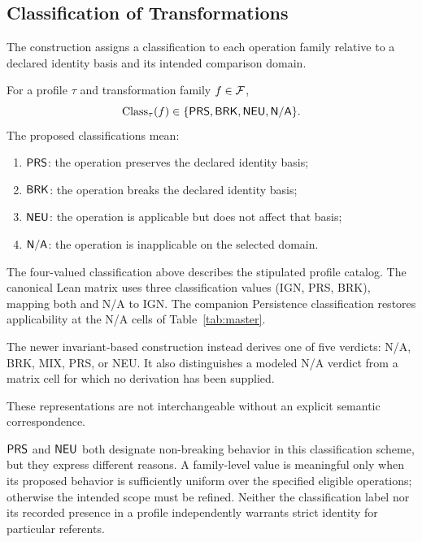 \subsection{Classification of Transformations}
\label{subsec:classification_transformations}

The construction assigns a classification to each operation family
relative to a declared identity basis and its intended comparison domain.

\begin{definition}
  \label{se200.def.TransformationClassification}
  For a profile $\tau$ and transformation family $f\in\mathcal{F}$,
  \[
    \mathrm{Class}_\tau(f)\in\{\textsf{PRS},\textsf{BRK},\textsf{NEU},\textsf{N/A}\}.
  \]
  The proposed classifications mean:
  \begin{enumerate}[label=(\alph*),nosep]
    \item $\textsf{PRS}$: the operation preserves the declared identity basis;
    \item $\textsf{BRK}$: the operation breaks the declared identity basis;
    \item $\textsf{NEU}$: the operation is applicable but does not affect that basis;
    \item $\textsf{N/A}$: the operation is inapplicable on the selected domain.
  \end{enumerate}
\end{definition}

The four-valued classification above describes the stipulated
profile catalog.
The canonical Lean matrix uses
three classification values (IGN, PRS, BRK),
mapping both \NEU{} and N/A to IGN.
The companion Persistence classification restores applicability
at the N/A cells of Table~\ref{tab:master}.

The newer invariant-based construction instead derives one of
five verdicts:
N/A, BRK, MIX, PRS, or NEU.
It also distinguishes
a modeled N/A verdict from a matrix cell for which no derivation
has been supplied.

These representations are not interchangeable without an
explicit semantic correspondence.

$\textsf{PRS}$ and $\textsf{NEU}$ both designate non-breaking behavior in this
classification scheme, but they express different reasons.
A family-level value is meaningful only when its proposed behavior
is sufficiently uniform over the specified eligible operations;
otherwise the intended scope must be refined.
Neither the classification label nor its recorded presence in a
profile independently warrants strict identity for particular referents.

